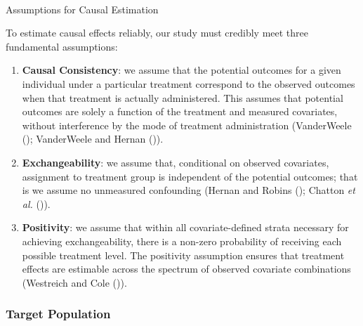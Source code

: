 \documentclass[
  single column]{article}
\makeatletter
\let\oldparagraph\paragraph
\renewcommand{\paragraph}{
    \@ifstar
      \xxxParagraphStar
      \xxxParagraphNoStar
  }
\newcommand{\xxxParagraphStar}[1]{\oldparagraph*{#1}\mbox{}}
\newcommand{\xxxParagraphNoStar}[1]{\oldparagraph{#1}\mbox{}}
\makeatother
\begin{document}
\paragraph{Assumptions for Causal
Estimation}\label{assumptions-for-causal-estimation}

To estimate causal effects reliably, our study must credibly meet three
fundamental assumptions:

\begin{enumerate}
\def\labelenumi{\arabic{enumi}.}
\item
  \textbf{Causal Consistency}: we assume that the potential outcomes for
  a given individual under a particular treatment correspond to the
  observed outcomes when that treatment is actually administered. This
  assumes that potential outcomes are solely a function of the treatment
  and measured covariates, without interference by the mode of treatment
  administration (VanderWeele ();
  VanderWeele and Hernan ()).
\item
  \textbf{Exchangeability}: we assume that, conditional on observed
  covariates, assignment to treatment group is independent of the
  potential outcomes; that is we assume no unmeasured confounding
  (Hernan and Robins (); Chatton
  \emph{et al.} ()).
\item
  \textbf{Positivity}: we assume that within all covariate-defined
  strata necessary for achieving exchangeability, there is a non-zero
  probability of receiving each possible treatment level. The positivity
  assumption ensures that treatment effects are estimable across the
  spectrum of observed covariate combinations (Westreich and Cole
  ()).
\end{enumerate}

\subsubsection{Target Population}\label{target-population}
\end{document}

